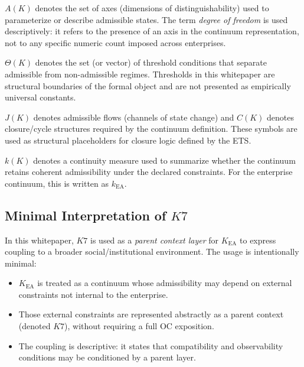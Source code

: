\begin{definition}
$A(K)$ denotes the set of axes (dimensions of distinguishability) used to
parameterize or describe admissible states. The term \emph{degree of
freedom} is used descriptively: it refers to the presence of an axis in
the continuum representation, not to any specific numeric count imposed
across enterprises.
\end{definition}

\begin{definition}[Thresholds]
$\Theta(K)$ denotes the set (or vector) of threshold conditions that
separate admissible from non-admissible regimes. Thresholds in this
whitepaper are structural boundaries of the formal object and are not
presented as empirically universal constants.
\end{definition}

\begin{definition}
$J(K)$ denotes admissible flows (channels of state change) and $C(K)$
denotes closure/cycle structures required by the continuum definition.
These symbols are used as structural placeholders for closure logic
defined by the ETS.
\end{definition}

\begin{definition}
$k(K)$ denotes a continuity measure used to summarize whether the
continuum retains coherent admissibility under the declared constraints.
For the enterprise continuum, this is written as $k_{\mathrm{EA}}$.
\end{definition}

\subsection*{Minimal Interpretation of \texorpdfstring{$K7$}{K7}}

In this whitepaper, $K7$ is used as a \emph{parent context layer} for
$K_{\mathrm{EA}}$ to express coupling to a broader social/institutional
environment. The usage is intentionally minimal:

\begin{itemize}
  \item $K_{\mathrm{EA}}$ is treated as a continuum whose admissibility
  may depend on external constraints not internal to the enterprise.
  \item Those external constraints are represented abstractly as a
  parent context (denoted $K7$), without requiring a full OC exposition.
  \item The coupling is descriptive: it states that compatibility and
  observability conditions may be conditioned by a parent layer.
\end{itemize}

